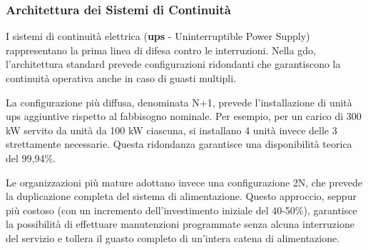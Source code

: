 \subsubsection{Architettura dei Sistemi di Continuità}

I sistemi di continuità elettrica (\textbf{\gls{ups}} - Uninterruptible Power Supply) rappresentano la prima linea di difesa contro le interruzioni. Nella \gls{gdo}, l'architettura standard prevede configurazioni ridondanti che garantiscono la continuità operativa anche in caso di guasti multipli\autocite{IEEE2024}.

La configurazione più diffusa, denominata N+1, prevede l'installazione di unità \gls{ups} aggiuntive rispetto al fabbisogno nominale. Per esempio, per un carico di 300 kW servito da unità da 100 kW ciascuna, si installano 4 unità invece delle 3 strettamente necessarie. Questa ridondanza garantisce una disponibilità teorica del 99,94\%.

Le organizzazioni più mature adottano invece una configurazione 2N, che prevede la duplicazione completa del sistema di alimentazione. Questo approccio, seppur più costoso (con un incremento dell'investimento iniziale del 40-50\%), garantisce la possibilità di effettuare manutenzioni programmate senza alcuna interruzione del servizio e tollera il guasto completo di un'intera catena di alimentazione.

